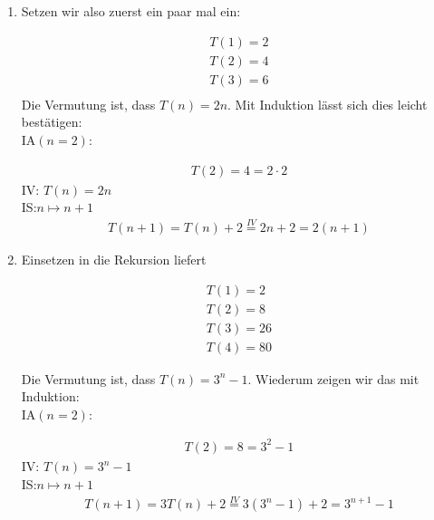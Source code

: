 \begin{solution}
\begin{enumerate}[label = \alph*]
  \item Setzen wir also zuerst ein paar mal ein:

  \begin{align*}
    T(1) = 2 \\
    T(2) = 4 \\
    T(3) = 6 \\
  \end{align*}
 Die Vermutung ist, dass $T(n) = 2n$. Mit Induktion lässt sich dies leicht bestätigen: \\
  IA$(n=2)$:

  \begin{align*}
    T(2) = 4 = 2 \cdot 2
  \end{align*}
  IV: $T(n) = 2n$ \\

  IS:$n \mapsto n+1$
  \begin{align*}
    T(n+1)
    =
    T(n) + 2
    \stackrel{IV}{=}
    2n + 2
    =
    2(n+1)
  \end{align*}

  \item Einsetzen in die Rekursion liefert

  \begin{align*}
    T(1) = 2 \\
    T(2) = 8 \\
    T(3) = 26 \\
    T(4) = 80
  \end{align*}

  Die Vermutung ist, dass $T(n) = 3^n - 1$. Wiederum zeigen wir das mit Induktion: \\
  IA$(n=2)$:

  \begin{align*}
    T(2) = 8 = 3^2 - 1
  \end{align*}
  IV: $T(n) = 3^n - 1$ \\

  IS:$n \mapsto n+1$
  \begin{align*}
    T(n+1)
    =
    3T(n) + 2
    \stackrel{IV}{=}
    3(3^n - 1) + 2
    =
    3^{n+1} - 1
  \end{align*}
  \end{enumerate}

\end{solution}

